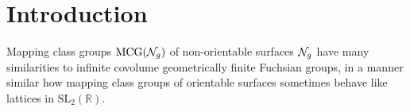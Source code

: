 \section{Introduction}
\label{sec:introduction}



Mapping class groups $\mathrm{MCG}(\mathcal{N}_g)$ of non-orientable surfaces $\mathcal{N}_g$ have many similarities to infinite covolume geometrically finite Fuchsian groups, in a manner similar how mapping class groups of orientable surfaces sometimes behave like lattices in $\mathrm{SL}_2(\mathbb{R})$.

